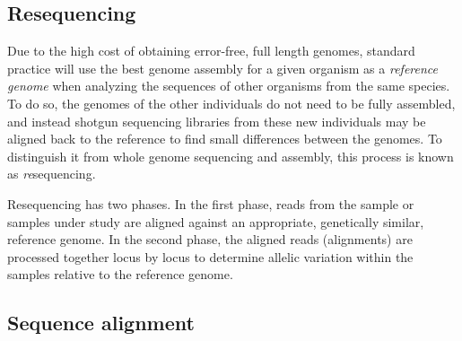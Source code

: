 \documentclass[a4paper,12pt,numbered,oneside]{Classes/PhDThesisPSnPDF}
\providecommand{\DIFaddbegin}{} %
\providecommand{\DIFaddend}{} %
\begin{document}
\subsection{Resequencing}
\DIFaddbegin \label{sec:resequencing}
\DIFaddend 

Due to the high cost of obtaining error-free, full length genomes, standard practice will use the best genome assembly for a given organism as a \emph{reference genome} when analyzing the sequences of other organisms from the same species.
To do so, the genomes of the other individuals do not need to be fully assembled, and instead shotgun sequencing libraries from these new individuals may be aligned back to the reference to find small differences between the genomes.
To distinguish it from whole genome sequencing and assembly, this process is known as \emph{re}sequencing.

Resequencing has two phases.
In the first phase, reads from the sample or samples under study are aligned against an appropriate, genetically similar, reference genome.
In the second phase, the aligned reads (alignments) are processed together locus by locus to determine allelic variation within the samples relative to the reference genome.

\subsection{Sequence alignment}
\label{sec:sequence_alignment}
\end{document}

